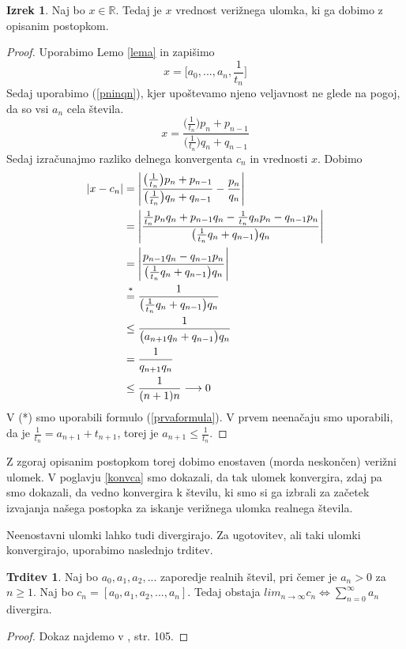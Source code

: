 \documentclass[a4paper,12pt]{article}
\newcommand{\R}{\mathbb{R}}
\newcommand{\equaltext}[1]{\ensuremath{\stackrel{\text{#1}}{=}}}
\theoremstyle{definition}
\theoremstyle{proposition}
\newtheorem{trd}{Trditev}[section]
\theoremstyle{theorem}
\newtheorem{iz}{Izrek}[section]
\theoremstyle{lemma}
\begin{document}
\begin{iz}
\label{postopek}
Naj bo $x \in \R$. Tedaj je $x$ vrednost verižnega ulomka, ki ga dobimo z opisanim postopkom.
\end{iz}
\begin{proof}
Uporabimo Lemo \ref{lema} in zapišimo
\[ x =\big[a_0,..., a_n, \frac{1}{t_n}\big]\]
Sedaj uporabimo (\ref{pninqn}), kjer upoštevamo njeno veljavnost ne glede na pogoj, da so vsi $a_n$ cela števila.
\[x=\frac{\big(\frac{1}{t_n}\big)p_n+p_{n-1}}{\big(\frac{1}{t_n}\big)q_n+q_{n-1}}\]
Sedaj izračunajmo razliko delnega konvergenta $c_n$ in vrednosti $x$. Dobimo
\begin{equation*}
\begin{split}
\left|x-c_n\right|   &=\left|\frac{\big(\frac{1}{t_n}\big)p_n+p_{n-1}}{\big(\frac{1}{t_n}\big)q_n+q_{n-1}}-\frac{p_n}{q_n}\right|\\
&= \left|\frac{\frac{1}{t_n}p_n q_n + p_{n-1}q_n - \frac{1}{t_n}q_n p_n - q_{n-1} p_n}{\big(\frac{1}{t_n}q_n+q_{n-1}\big)q_n}\right| \\
&= \left|\frac{p_{n-1}q_n - q_{n-1} p_n}{\big(\frac{1}{t_n}q_n+q_{n-1}\big)q_n}\right| \\
&\equaltext{\text{*}}{} \frac{1}{\big(\frac{1}{t_n}q_n+q_{n-1}\big)q_n} \\
&\leq \frac{1}{\big(a_{n+1}q_n + q_{n-1}\big)q_n} \\
&= \frac{1}{q_{n+1}q_n} \\
&\leq \frac{1}{(n+1)n} \longrightarrow 0
\end{split}
\end{equation*}
V (*) smo uporabili formulo (\ref{prvaformula}). V prvem neenačaju smo uporabili, da je $\frac{1}{t_n} = a_{n+1}+t_{n+1}$, torej je $a_{n+1} \leq \frac{1}{t_n}$.
\end{proof}

Z zgoraj opisanim postopkom torej dobimo enostaven (morda neskončen) verižni ulomek. V poglavju \ref{konvca} smo dokazali, da tak ulomek konvergira, zdaj pa smo dokazali, da vedno konvergira k številu, ki smo si ga izbrali za začetek izvajanja našega postopka za iskanje verižnega ulomka realnega števila.\par
Neenostavni ulomki lahko tudi divergirajo. Za ugotovitev, ali taki ulomki konvergirajo, uporabimo naslednjo trditev.

\begin{trd}
\label{divergenca}
Naj bo $a_0, a_1, a_2, ...$ zaporedje realnih števil, pri čemer je $a_n > 0$ za $n\geq1$. Naj bo $c_n = [a_0, a_1, a_2, ..., a_n]$. Tedaj obstaja $lim_{n\to\infty}c_n \Leftrightarrow \sum_{n=0}^{\infty}a_n$ divergira.
\end{trd}
\begin{proof}
Dokaz najdemo v \cite{teorijastevil}, str. 105.
\end{proof}
\end{document}
